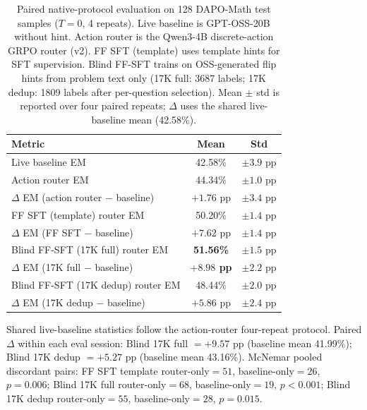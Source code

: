 \begin{table}[t]
\centering
\small
\setlength{\tabcolsep}{6pt}
\caption{Paired native-protocol evaluation on 128 DAPO-Math test samples ($T{=}0$, 4 repeats).
Live baseline is GPT-OSS-20B without hint.
Action router is the Qwen3-4B discrete-action GRPO router (v2).
FF SFT (template) uses template hints for SFT supervision.
Blind FF-SFT trains on OSS-generated flip hints from problem text only (17K full: 3687 labels; 17K dedup: 1809 labels after per-question selection).
Mean $\pm$ std is reported over four paired repeats; $\Delta$ uses the shared live-baseline mean (42.58\%).}
\label{tab:dapo-blind-ff-comparison}
\begin{tabular}{lcc}
\toprule
\textbf{Metric} & \textbf{Mean} & \textbf{Std} \\
\midrule
Live baseline EM                         & 42.58\% & $\pm 3.9$ pp \\
\midrule
Action router EM                         & 44.34\% & $\pm 1.0$ pp \\
$\Delta$ EM (action router $-$ baseline) & \textcolor{green!60!black}{$+1.76$ pp} & \textcolor{green!60!black}{$\pm 3.4$ pp} \\
\midrule
FF SFT (template) router EM              & 50.20\% & $\pm 1.4$ pp \\
$\Delta$ EM (FF SFT $-$ baseline)        & \textcolor{green!60!black}{$+7.62$ pp} & \textcolor{green!60!black}{$\pm 1.4$ pp} \\
\midrule
Blind FF-SFT (17K full) router EM        & \textbf{51.56\%} & $\pm 1.5$ pp \\
$\Delta$ EM (17K full $-$ baseline)      & \textcolor{green!60!black}{\textbf{$+8.98$ pp}} & \textcolor{green!60!black}{$\pm 2.2$ pp} \\
\midrule
Blind FF-SFT (17K dedup) router EM       & 48.44\% & $\pm 2.0$ pp \\
$\Delta$ EM (17K dedup $-$ baseline)     & \textcolor{green!60!black}{$+5.86$ pp} & \textcolor{green!60!black}{$\pm 2.4$ pp} \\
\bottomrule
\end{tabular}

\vspace{0.25em}
{\scriptsize
Shared live-baseline statistics follow the action-router four-repeat protocol.
Paired $\Delta$ within each eval session: Blind 17K full $=+9.57$ pp (baseline mean 41.99\%);
Blind 17K dedup $=+5.27$ pp (baseline mean 43.16\%).
McNemar pooled discordant pairs: FF SFT template router-only$=51$, baseline-only$=26$, $p{=}0.006$;
Blind 17K full router-only$=68$, baseline-only$=19$, $p{<}0.001$;
Blind 17K dedup router-only$=55$, baseline-only$=28$, $p{=}0.015$.
}
\end{table}
